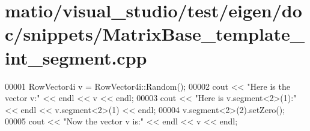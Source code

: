 \hypertarget{matio_2visual__studio_2test_2eigen_2doc_2snippets_2_matrix_base__template__int__segment_8cpp_source}{}\section{matio/visual\+\_\+studio/test/eigen/doc/snippets/\+Matrix\+Base\+\_\+template\+\_\+int\+\_\+segment.cpp}
\label{matio_2visual__studio_2test_2eigen_2doc_2snippets_2_matrix_base__template__int__segment_8cpp_source}

\begin{DoxyCode}
00001 RowVector4i v = RowVector4i::Random();
00002 cout << \textcolor{stringliteral}{"Here is the vector v:"} << endl << v << endl;
00003 cout << \textcolor{stringliteral}{"Here is v.segment<2>(1):"} << endl << v.segment<2>(1) << endl;
00004 v.segment<2>(2).setZero();
00005 cout << \textcolor{stringliteral}{"Now the vector v is:"} << endl << v << endl;
\end{DoxyCode}
